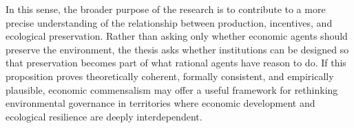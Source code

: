 In this sense, the broader purpose of the research is to contribute to a more precise understanding of the relationship between production, incentives, and ecological preservation. Rather than asking only whether economic agents should preserve the environment, the thesis asks whether institutions can be designed so that preservation becomes part of what rational agents have reason to do. If this proposition proves theoretically coherent, formally consistent, and empirically plausible, economic commensalism may offer a useful framework for rethinking environmental governance in territories where economic development and ecological resilience are deeply interdependent.

\newpage


